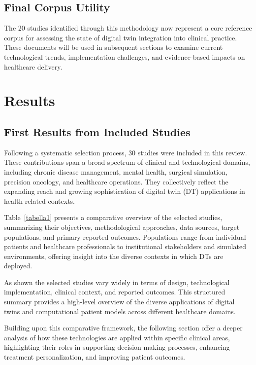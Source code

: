 \documentclass[10pt,a4paper]{article}
\begin{document}
\subsection*{Final Corpus Utility}

The 20 studies identified through this methodology now represent a core reference corpus for assessing the state of digital twin integration into clinical practice. These documents will be used in subsequent sections to examine current technological trends, implementation challenges, and evidence-based impacts on healthcare delivery.




\section{Results}

\subsection*{First Results from Included Studies}
Following a systematic selection process, 30 studies were included in this review. These contributions span a broad spectrum of clinical and technological domains, including chronic disease management, mental health, surgical simulation, precision oncology, and healthcare operations. They collectively reflect the expanding reach and growing sophistication of digital twin (DT) applications in health-related contexts.

Table~\ref{tabella1} presents a comparative overview of the selected studies, summarizing their objectives, methodological approaches, data sources, target populations, and primary reported outcomes. Populations range from individual patients and healthcare professionals to institutional stakeholders and simulated environments, offering insight into the diverse contexts in which DTs are deployed.

As shown the selected studies vary widely in terms of design, technological implementation, clinical context, and reported outcomes. This structured summary provides a high-level overview of the diverse applications of digital twins and computational patient models across different healthcare domains.

Building upon this comparative framework, the following section offer a deeper analysis of how these technologies are applied within specific clinical areas, highlighting their roles in supporting decision-making processes, enhancing treatment personalization, and improving patient outcomes.
\end{document}
